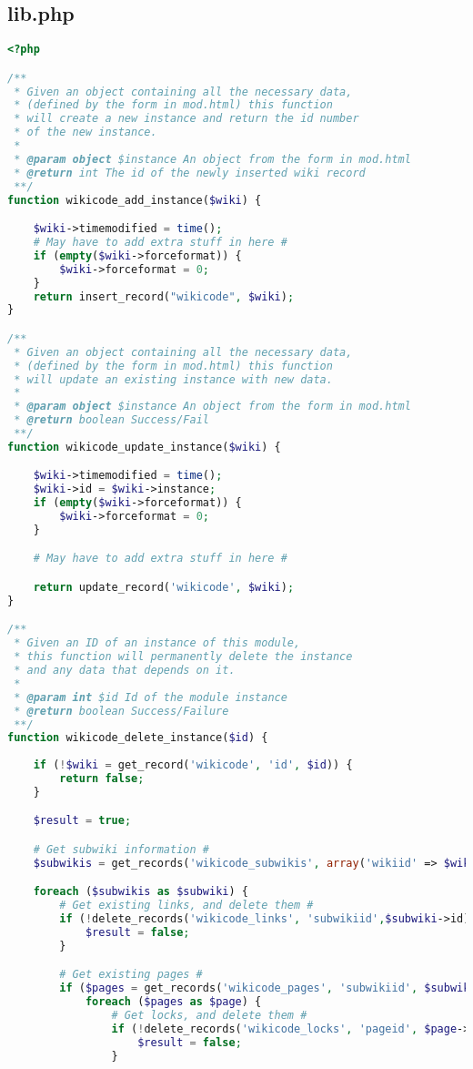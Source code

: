 \subsection{lib.php}
\begin{lstlisting}[language=PHP]
<?php

/**
 * Given an object containing all the necessary data,
 * (defined by the form in mod.html) this function
 * will create a new instance and return the id number
 * of the new instance.
 *
 * @param object $instance An object from the form in mod.html
 * @return int The id of the newly inserted wiki record
 **/
function wikicode_add_instance($wiki) {

    $wiki->timemodified = time();
    # May have to add extra stuff in here #
    if (empty($wiki->forceformat)) {
        $wiki->forceformat = 0;
    }
	return insert_record("wikicode", $wiki);
}

/**
 * Given an object containing all the necessary data,
 * (defined by the form in mod.html) this function
 * will update an existing instance with new data.
 *
 * @param object $instance An object from the form in mod.html
 * @return boolean Success/Fail
 **/
function wikicode_update_instance($wiki) {

    $wiki->timemodified = time();
    $wiki->id = $wiki->instance;
    if (empty($wiki->forceformat)) {
        $wiki->forceformat = 0;
    }

    # May have to add extra stuff in here #

    return update_record('wikicode', $wiki);
}

/**
 * Given an ID of an instance of this module,
 * this function will permanently delete the instance
 * and any data that depends on it.
 *
 * @param int $id Id of the module instance
 * @return boolean Success/Failure
 **/
function wikicode_delete_instance($id) {
    
    if (!$wiki = get_record('wikicode', 'id', $id)) {
        return false;
    }

    $result = true;

    # Get subwiki information #
    $subwikis = get_records('wikicode_subwikis', array('wikiid' => $wiki->id));

    foreach ($subwikis as $subwiki) {
        # Get existing links, and delete them #
        if (!delete_records('wikicode_links', 'subwikiid',$subwiki->id)) {
            $result = false;
        }

        # Get existing pages #
        if ($pages = get_records('wikicode_pages', 'subwikiid', $subwiki->id)) {
            foreach ($pages as $page) {
                # Get locks, and delete them #
                if (!delete_records('wikicode_locks', 'pageid', $page->id)) {
                    $result = false;
                }


\end{lstlisting}

